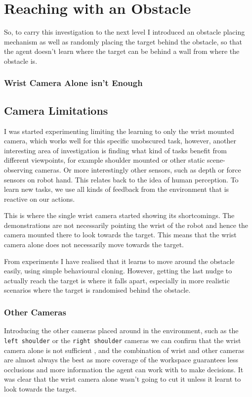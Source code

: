 \section{Reaching with an Obstacle}
So, to carry this investigation to the next level I introduced an obstacle placing mechanism as well as randomly placing the target behind the obstacle, so that the agent doesn't learn where the target can be behind a wall from where the obstacle is.

\subsubsection{Wrist Camera Alone isn't Enough}
\subsection{Camera Limitations}


I was started experimenting limiting the learning to only the wrist mounted camera, which works well for this specific unobscured task, however, another interesting area of investigation is finding what kind of tasks benefit from different viewpoints, for example shoulder mounted or other static scene-observing cameras. 
Or more interestingly other sensors, such as depth or force sensors on robot hand. This relates back to the idea of human perception. To learn new tasks, we use all kinds of feedback from the environment that is reactive on our actions.

This is where the single wrist camera started showing its shortcomings. The demonstrations are not necessarily pointing the wrist of the robot and hence the camera mounted there to look towards the target. This means that the wrist camera alone does not necessarily move towards the target.

From experiments I have realised that it learns to move around the obstacle easily, using simple behavioural cloning. However, getting the last nudge to actually reach the target is where it falls apart, especially in more realistic scenarios where the target is randomised behind the obstacle.

\subsubsection{Other Cameras}
Introducing the other cameras placed around in the environment, such as the \verb|left shoulder| or the \verb|right shoulder| cameras we can confirm that the wrist camera alone is not sufficient , and the combination of wrist and other cameras are almost always the best as more coverage of the workspace guarantees less occlusions and more information the agent can work with to make decisions. It was clear that the wrist camera alone wasn't going to cut it unless it learnt to look towards the target.

